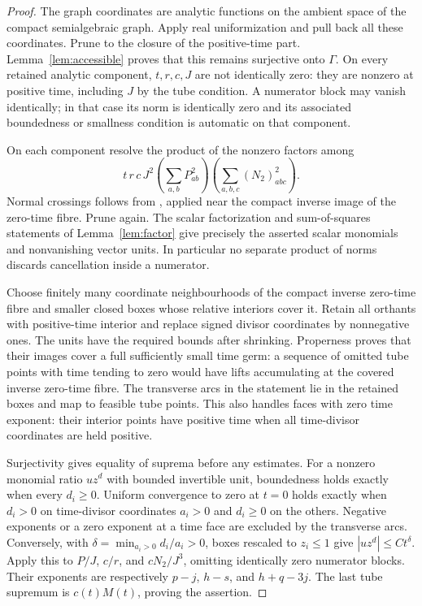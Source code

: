 \begin{proof}
The graph coordinates are analytic functions on the ambient space of the compact semialgebraic graph. Apply real uniformization \cite[Theorem 0.1]{BM} and pull back all these coordinates. Prune to the closure of the positive-time part. Lemma~\ref{lem:accessible} proves that this remains surjective onto $\Gamma$. On every retained analytic component, $t,r,c,J$ are not identically zero: they are nonzero at positive time, including $J$ by the tube condition. A numerator block may vanish identically; in that case its norm is identically zero and its associated boundedness or smallness condition is automatic on that component.

On each component resolve the product of the nonzero factors among
\[
 t\,r\,c\,J^2\left(\sum_{a,b}P_{ab}^2\right)
                \left(\sum_{a,b,c}(N_2)_{abc}^2\right).
\]
Normal crossings follows from \cite[Corollary 4.9]{BM}, applied near the compact inverse image of the zero-time fibre. Prune again. The scalar factorization and sum-of-squares statements of Lemma~\ref{lem:factor} give precisely the asserted scalar monomials and nonvanishing vector units. In particular no separate product of norms discards cancellation inside a numerator.

Choose finitely many coordinate neighbourhoods of the compact inverse zero-time fibre and smaller closed boxes whose relative interiors cover it. Retain all orthants with positive-time interior and replace signed divisor coordinates by nonnegative ones. The units have the required bounds after shrinking. Properness proves that their images cover a full sufficiently small time germ: a sequence of omitted tube points with time tending to zero would have lifts accumulating at the covered inverse zero-time fibre. The transverse arcs in the statement lie in the retained boxes and map to feasible tube points. This also handles faces with zero time exponent: their interior points have positive time when all time-divisor coordinates are held positive.

Surjectivity gives equality of suprema before any estimates. For a nonzero monomial ratio $uz^d$ with bounded invertible unit, boundedness holds exactly when every $d_i\ge0$. Uniform convergence to zero at $t=0$ holds exactly when $d_i>0$ on time-divisor coordinates $a_i>0$ and $d_i\ge0$ on the others. Negative exponents or a zero exponent at a time face are excluded by the transverse arcs. Conversely, with
$\delta=\min_{a_i>0}d_i/a_i>0$, boxes rescaled to $z_i\le1$ give $|uz^d|\le Ct^\delta$. Apply this to $P/J$, $c/r$, and $cN_2/J^3$, omitting identically zero numerator blocks. Their exponents are respectively $p-j$, $h-s$, and $h+q-3j$. The last tube supremum is $c(t)M(t)$, proving the assertion.
\end{proof}

